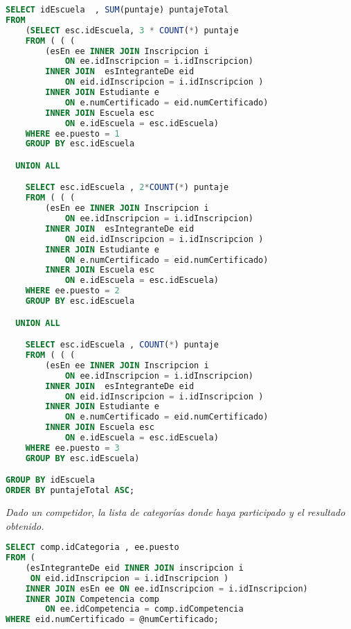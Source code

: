 \begin{lstlisting}[language=SQL]
SELECT idEscuela  , SUM(puntaje) puntajeTotal
FROM
    (SELECT esc.idEscuela, 3 * COUNT(*) puntaje
    FROM ( ( (
        (esEn ee INNER JOIN Inscripcion i
            ON ee.idInscripcion = i.idInscripcion)
        INNER JOIN  esIntegranteDe eid
            ON eid.idInscripcion = i.idInscripcion )
        INNER JOIN Estudiante e
            ON e.numCertificado = eid.numCertificado)
        INNER JOIN Escuela esc
            ON e.idEscuela = esc.idEscuela)
    WHERE ee.puesto = 1
    GROUP BY esc.idEscuela

  UNION ALL

    SELECT esc.idEscuela , 2*COUNT(*) puntaje
    FROM ( ( (
        (esEn ee INNER JOIN Inscripcion i
            ON ee.idInscripcion = i.idInscripcion)
        INNER JOIN  esIntegranteDe eid
            ON eid.idInscripcion = i.idInscripcion )
        INNER JOIN Estudiante e
            ON e.numCertificado = eid.numCertificado)
        INNER JOIN Escuela esc
            ON e.idEscuela = esc.idEscuela)
    WHERE ee.puesto = 2
    GROUP BY esc.idEscuela

  UNION ALL

    SELECT esc.idEscuela , COUNT(*) puntaje
    FROM ( ( (
        (esEn ee INNER JOIN Inscripcion i
            ON ee.idInscripcion = i.idInscripcion)
        INNER JOIN  esIntegranteDe eid
            ON eid.idInscripcion = i.idInscripcion )
        INNER JOIN Estudiante e
            ON e.numCertificado = eid.numCertificado)
        INNER JOIN Escuela esc
            ON e.idEscuela = esc.idEscuela)
    WHERE ee.puesto = 3
    GROUP BY esc.idEscuela)

GROUP BY idEscuela
ORDER BY puntajeTotal ASC;
\end{lstlisting}


\emph{Dado un competidor, la lista de categorías donde haya participado y el resultado obtenido.}
\begin{lstlisting}[language=SQL]
SELECT comp.idCategoria , ee.puesto
FROM (
    (esIntegranteDe eid INNER JOIN inscripcion i
     ON eid.idInscripcion = i.idInscripcion )
    INNER JOIN esEn ee ON ee.idInscripcion = i.idInscripcion)
    INNER JOIN Competencia comp
        ON ee.idCompetencia = comp.idCompetencia
WHERE eid.numCertificado = @numCertificado;
\end{lstlisting}



